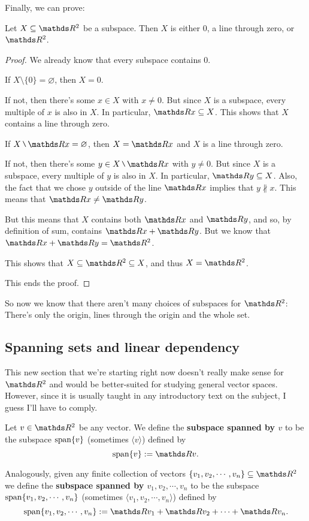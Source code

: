 Finally, we can prove:

\begin{theorem}
	Let $X\subseteq \R^2$ be a subspace. Then $X$ is either 0, a line through zero, or $\R^2$.
\end{theorem}
\begin{proof}
	We already know that every subspace contains 0.
	
	If $X\setminus\{0\}=\varnothing$, then $X=0$.
	
	\bigskip
	If not, then there's some $x\in X$ with $x\neq 0$. But since $X$ is a subspace, every multiple of $x$ is also in $X$. In particular, $\R x\subseteq X$. This shows that $X$ contains a line through zero.
	
	If $X\setminus\R x=\varnothing$, then $X=\R x$ and $X$ is a line through zero.
	
	\bigskip
	If not, then there's some $y\in X\setminus\R x$ with $y\neq 0$. But since $X$ is a subspace, every multiple of $y$ is also in $X$. In particular, $\R y\subseteq X$. Also, the fact that we chose $y$ outside of the line $\R x$ implies that $y\nparallel x$. This means that $\R x\neq\R y$.
	
	But this means that $X$ contains both $\R x$ and $\R y$, and so, by definition of sum, contains $\R x+\R y$. But we know that $\R x+\R y=\R^2$.
	
	This shows that $X\subseteq \R^2\subseteq X$, and thus $X=\R^2$.
	
	This ends the proof.
\end{proof}

So now we know that there aren't many choices of subspaces for $\R^2$: There's only the origin, lines through the origin and the whole set.

\newpage
\subsection{Spanning sets and linear dependency}

This new section that we're starting right now doesn't really make sense for $\R^2$ and would be better-suited for studying general vector spaces. However, since it is usually taught in any introductory text on the subject, I guess I'll have to comply.

\begin{df}
	Let $v\in \R^2$ be any vector. We define the \textbf{subspace spanned by $v$} to be the subspace $\operatorname{span} \{v\}$ (sometimes $\langle v\rangle$) defined by
	\[\spen\{v\}:=\R v.\]
	
	Analogously, given any finite collection of vectors $\{v_1,v_2,\cdots,v_n\}\subseteq \R^2$ we define the \textbf{subspace spanned by $v_1,v_2,\cdots,v_n$} to be the subspace $\operatorname{span}\{v_1,v_2,\cdots,v_n\}$ (sometimes $\langle v_1,v_2,\cdots,v_n\rangle$) defined by
	\[\spen\{v_1,v_2,\cdots,v_n\}:=\R v_1+\R v_2+\cdots+\R v_n.\]
\end{df}

